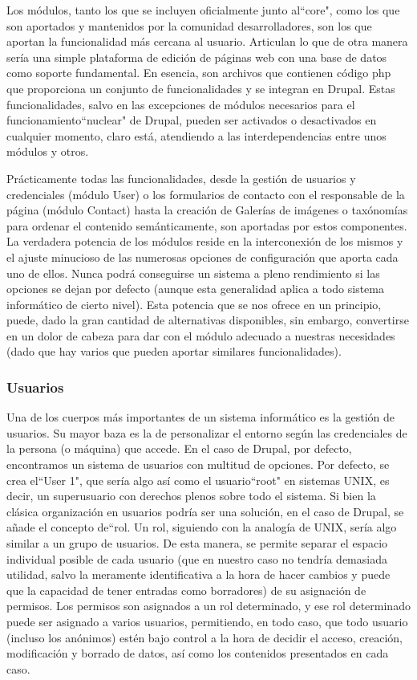 \par Los módulos, tanto los que se incluyen oficialmente junto al``core", como los que son aportados y mantenidos por la comunidad desarrolladores, son los que aportan la funcionalidad más cercana al usuario. Articulan lo que de otra manera sería una simple plataforma de edición de páginas web con una base de datos como soporte fundamental.
En esencia, son archivos que contienen código php que proporciona un conjunto de funcionalidades y se integran en Drupal. Estas funcionalidades, salvo en las excepciones de módulos necesarios para el funcionamiento``nuclear" de Drupal, pueden ser activados o desactivados en cualquier momento, claro está, atendiendo a las interdependencias entre unos módulos y otros.
\par Prácticamente todas las funcionalidades, desde la gestión de usuarios y credenciales (módulo User) o los formularios de contacto con el responsable de la página (módulo Contact) hasta la creación de Galerías de imágenes o taxónomías para ordenar el contenido semánticamente, son aportadas por estos componentes.
La verdadera potencia de los módulos reside en la interconexión de los mismos y el ajuste minucioso de las numerosas opciones de configuración que aporta cada uno de ellos. Nunca podrá conseguirse un sistema a pleno rendimiento si las opciones se dejan por defecto (aunque esta generalidad aplica a todo sistema informático de cierto nivel). Esta potencia que se nos ofrece en un principio, puede, dado la gran cantidad de alternativas disponibles, sin embargo, convertirse en un dolor de cabeza para dar con el módulo adecuado a nuestras necesidades (dado que hay varios que pueden aportar similares funcionalidades).

\subsubsection{Usuarios} 

\par Una de los cuerpos más importantes de un sistema informático es la gestión de usuarios. Su mayor baza es la de personalizar el entorno según las credenciales de la persona (o máquina) que accede. En el caso de Drupal, por defecto, encontramos un sistema de usuarios con multitud de opciones. Por defecto, se crea el``User 1", que sería algo así como el usuario``root" en sistemas UNIX, es decir, un superusuario con derechos plenos sobre todo el sistema.
Si bien la clásica organización en usuarios podría ser una solución, en el caso de Drupal, se añade el concepto de``rol. Un rol, siguiendo con la analogía de UNIX, sería algo similar a un grupo de usuarios. De esta manera, se permite separar el espacio individual posible de cada usuario (que en nuestro caso no tendría demasiada utilidad, salvo la meramente identificativa a la hora de hacer cambios y puede que la capacidad de tener entradas como borradores) de su asignación de permisos.
Los permisos son asignados a un rol determinado, y ese rol determinado puede ser asignado a varios usuarios, permitiendo, en todo caso, que todo usuario (incluso los anónimos) estén bajo control a la hora de decidir el acceso, creación, modificación y borrado de datos, así como los contenidos presentados en cada caso.

